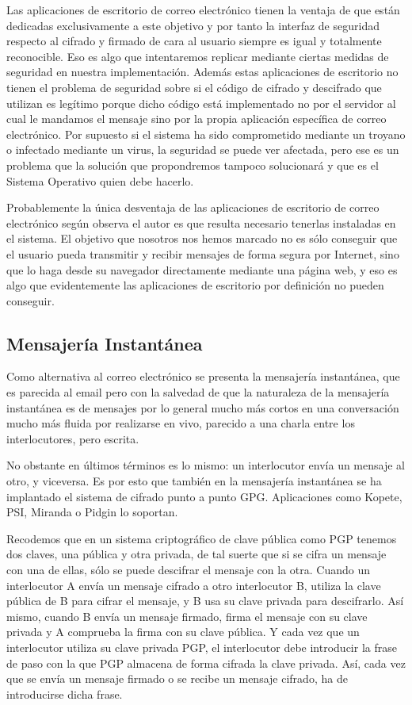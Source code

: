 Las aplicaciones de escritorio de correo electrónico tienen la ventaja de que están dedicadas exclusivamente a este objetivo y por tanto la interfaz de seguridad respecto al cifrado y firmado de cara al usuario siempre es igual y totalmente reconocible. Eso es algo que intentaremos replicar mediante ciertas medidas de seguridad en nuestra implementación. Además estas aplicaciones de escritorio no tienen el problema de seguridad sobre si el código de cifrado y descifrado que utilizan es legítimo porque dicho código está implementado no por el servidor al cual le mandamos el mensaje sino por la propia aplicación específica de correo electrónico. Por supuesto si el sistema ha sido comprometido mediante un troyano o infectado mediante un virus, la seguridad se puede ver afectada, pero ese es un problema que la solución que propondremos tampoco solucionará y que es el Sistema Operativo quien debe hacerlo.

Probablemente la única desventaja de las aplicaciones de escritorio de correo electrónico según observa el autor es que resulta necesario tenerlas instaladas en el sistema. El objetivo que nosotros nos hemos marcado no es sólo conseguir que el usuario pueda transmitir y recibir mensajes de forma segura por Internet, sino que lo haga desde su navegador directamente mediante una página web, y eso es algo que evidentemente las aplicaciones de escritorio por definición no pueden conseguir.

\subsection{Mensajería Instantánea}\label{appescritorio_im}

Como alternativa al correo electrónico se presenta la mensajería instantánea, que es parecida al email pero con la salvedad de que la naturaleza  de la mensajería instantánea es de mensajes por lo general mucho más cortos en una conversación mucho más fluida por realizarse en vivo, parecido a una charla entre los interlocutores, pero escrita.

No obstante en últimos términos es lo mismo: un interlocutor envía un mensaje al otro, y viceversa. Es por esto que también en la mensajería instantánea se ha implantado el sistema de cifrado punto a punto GPG. Aplicaciones como Kopete, PSI, Miranda o Pidgin lo soportan.

Recodemos que en un sistema criptográfico de clave pública como PGP tenemos dos claves, una pública y otra privada, de tal suerte que si se cifra un mensaje con una de ellas, sólo se puede descifrar el mensaje con la otra. Cuando un interlocutor A envía un mensaje cifrado a otro interlocutor B, utiliza la clave pública de B para cifrar el mensaje, y B usa su clave privada para descifrarlo. Así mismo, cuando B envía un mensaje firmado, firma el mensaje con su clave privada y A comprueba la firma con su clave pública. Y cada vez que un interlocutor utiliza su clave privada PGP, el interlocutor debe introducir la frase de paso con la que PGP almacena de forma cifrada la clave privada. Así, cada vez que se envía un mensaje firmado o se recibe un mensaje cifrado, ha de introducirse dicha frase.

